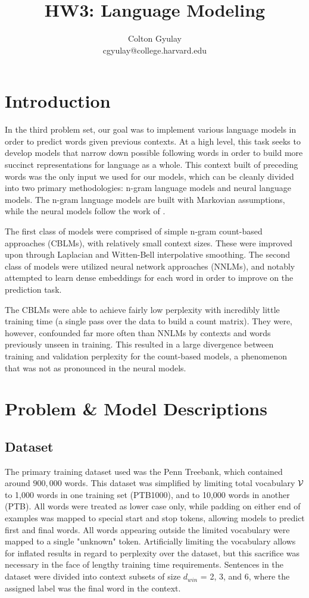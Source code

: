\documentclass[11pt]{article}
\title{HW3: Language Modeling}
\author{Colton Gyulay \\ cgyulay@college.harvard.edu }
\begin{document}
\maketitle{}
\section{Introduction}

In the third problem set, our goal was to implement various language models in order to predict words given previous contexts. At a high level, this task seeks to develop models that narrow down possible following words in order to build more succinct representations for language as a whole. This context built of preceding words was the only input we used for our models, which can be cleanly divided into two primary methodologies: n-gram language models and neural language models. The n-gram language models are built with Markovian assumptions, while the neural models follow the work of \citet{DBLP:journals/jmlr/BengioDVJ03}.

The first class of models were comprised of simple n-gram count-based approaches (CBLMs), with relatively small context sizes. These were improved upon through Laplacian and Witten-Bell interpolative smoothing. The second class of models were utilized neural network approaches (NNLMs), and notably attempted to learn dense embeddings for each word in order to improve on the prediction task.

The CBLMs were able to achieve fairly low perplexity with incredibly little training time (a single pass over the data to build a count matrix). They were, however, confounded far more often than NNLMs by contexts and words previously unseen in training. This resulted in a large divergence between training and validation perplexity for the count-based models, a phenomenon that was not as pronounced in the neural models.

\section{Problem \& Model Descriptions}

\subsection{Dataset}

The primary training dataset used was the Penn Treebank, which contained around $900,000$ words. This dataset was simplified by limiting total vocabulary $\mathcal{V}$ to 1,000 words in one training set (PTB1000), and to 10,000 words in another (PTB). All words were treated as lower case only, while padding on either end of examples was mapped to special start and stop tokens, allowing models to predict first and final words. All words appearing outside the limited vocabulary were mapped to a single "unknown" token. Artificially limiting the vocabulary allows for inflated results in regard to perplexity over the dataset, but this sacrifice was necessary in the face of lengthy training time requirements. Sentences in the dataset were divided into context subsets of size $d_{win}$ = 2, 3, and 6, where the assigned label was the final word in the context.
\end{document}
